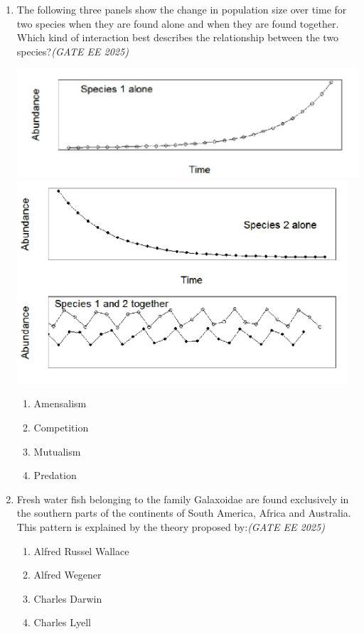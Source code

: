 \begin{enumerate}[leftmargin=*,label=\textbf{Q.\arabic*},resume]
\item The following three panels show the change in population size over time for two species when they are found alone and when they are found together. Which kind of interaction best describes the relationship between the two species?\hfill \textit{(GATE EE 2025)}
\vspace{1em}
\begin{center}
    \includegraphics[width=0.9\linewidth]{figs/ImageQ32a.png}  
    \includegraphics[width=0.9\linewidth]{figs/ImageQ32b.png}  
\end{center}

\vspace{1em}
\begin{multicols}{2}
\begin{enumerate}[label=(\Alph*)]
\item Amensalism
\item Competition
\item Mutualism
\item Predation
\end{enumerate}
\end{multicols}

\item Fresh water fish belonging to the family Galaxoidae are found exclusively in the southern parts of the continents of South America, Africa and Australia. This pattern is explained by the theory proposed by:\hfill \textit{(GATE EE 2025)}
\begin{multicols}{2}
\begin{enumerate}[label=(\Alph*)]
\item Alfred Russel Wallace
\item Alfred Wegener
\item Charles Darwin
\item Charles Lyell
\end{enumerate}
\end{multicols}


\end{enumerate}
